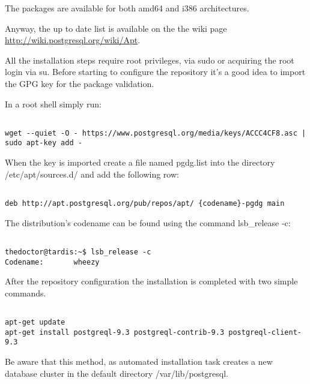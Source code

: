 The packages are available for both amd64 and i386 architectures.

Anyway, the up to date list is available on the the wiki page
\href{http://wiki.postgresql.org/wiki/Apt}{http://wiki.postgresql.org/wiki/Apt}.\newline

All the installation steps require root privileges, via sudo or acquiring the
root login via su. Before starting to configure the repository it's a good idea
to import the GPG key for the package validation.

In a root shell simply run:

\begin{verbatim}

wget --quiet -O - https://www.postgresql.org/media/keys/ACCC4CF8.asc | sudo apt-key add -

\end{verbatim}

When the key is imported create a file named pgdg.list into the directory
/etc/apt/sources.d/ and add the following row:

\begin{verbatim}

deb http://apt.postgresql.org/pub/repos/apt/ {codename}-pgdg main

\end{verbatim}


The distribution's codename can be found using the command lsb\_release -c:

\begin{verbatim}

thedoctor@tardis:~$ lsb_release -c
Codename:       wheezy

\end{verbatim}

After the repository configuration the installation is completed with two
simple commands.

\begin{verbatim}

apt-get update
apt-get install postgreql-9.3 postgreql-contrib-9.3 postgreql-client-9.3

\end{verbatim}

Be aware that this method, as automated installation task creates a new
database cluster in the default directory /var/lib/postgresql.

